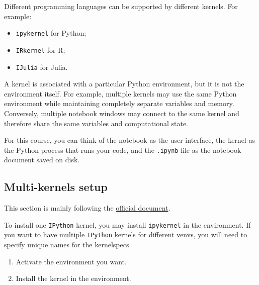\documentclass[
  letterpaper,
  DIV=11,
  numbers=noendperiod]{scrreprt}
\providecommand{\tightlist}{%
  \setlength{\itemsep}{0pt}\setlength{\parskip}{0pt}}
\theoremstyle{definition}
\theoremstyle{definition}
\theoremstyle{plain}
\theoremstyle{plain}
\theoremstyle{remark}
\begin{document}
Different programming languages can be supported by different kernels.
For example:

\begin{itemize}
\tightlist
\item
  \texttt{ipykernel} for Python;
\item
  \texttt{IRkernel} for R;
\item
  \texttt{IJulia} for Julia.
\end{itemize}

\begin{tcolorbox}[enhanced jigsaw, arc=.35mm, bottomrule=.15mm, bottomtitle=1mm, breakable, colback=white, colbacktitle=quarto-callout-note-color!10!white, colframe=quarto-callout-note-color-frame, coltitle=black, left=2mm, leftrule=.75mm, opacityback=0, opacitybacktitle=0.6, rightrule=.15mm, title=\textcolor{quarto-callout-note-color}{\faInfo}\hspace{0.5em}{Kernel}, titlerule=0mm, toprule=.15mm, toptitle=1mm]

A kernel is associated with a particular Python environment, but it is
not the environment itself. For example, multiple kernels may use the
same Python environment while maintaining completely separate variables
and memory. Conversely, multiple notebook windows may connect to the
same kernel and therefore share the same variables and computational
state.

For this course, you can think of the notebook as the user interface,
the kernel as the Python process that runs your code, and the
\texttt{.ipynb} file as the notebook document saved on disk.

\end{tcolorbox}

\subsection{Multi-kernels setup}\label{multi-kernels-setup}

This section is mainly following the
\href{https://ipython.readthedocs.io/en/stable/install/kernel_install.html}{official
document}.

To install one \texttt{IPython} kernel, you may install
\texttt{ipykernel} in the environment. If you want to have multiple
\texttt{IPython} kernels for different venvs, you will need to specify
unique names for the kernelspecs.

\begin{enumerate}
\def\labelenumi{\arabic{enumi}.}
\tightlist
\item
  Activate the environment you want.
\item
  Install the kernel in the environment.
\end{enumerate}
\end{document}
